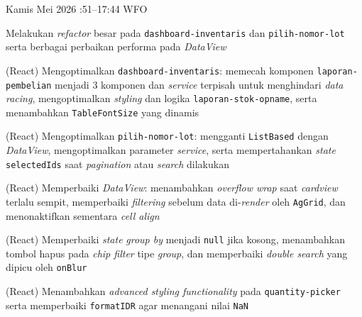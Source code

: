 \begin{logtable}
    {
        Kamis  Mei 2026 :51--17:44 \linebreak %
        WFO
    }{
        \begin{loglist}
            \item Melakukan \textit{refactor} besar pada \texttt{dashboard-inventaris} dan
            \texttt{pilih-nomor-lot} serta berbagai perbaikan performa pada
            \textit{DataView}
        \end{loglist}
    }{
        \begin{logwork}
            \item (React) Mengoptimalkan \texttt{dashboard-inventaris}: memecah komponen \texttt{laporan-pembelian} menjadi 3 komponen dan \textit{service} terpisah untuk menghindari \textit{data racing}, mengoptimalkan \textit{styling} dan logika \texttt{laporan-stok-opname}, serta menambahkan \texttt{TableFontSize} yang dinamis
            \item (React) Mengoptimalkan \texttt{pilih-nomor-lot}: mengganti \texttt{ListBased} dengan \textit{DataView}, mengoptimalkan parameter \textit{service}, serta mempertahankan \textit{state} \texttt{selectedIds} saat \textit{pagination} atau \textit{search} dilakukan
            \item (React) Memperbaiki \textit{DataView}: menambahkan \textit{overflow wrap} saat \textit{cardview} terlalu sempit, memperbaiki \textit{filtering} sebelum data di-\textit{render} oleh \texttt{AgGrid}, dan menonaktifkan sementara \textit{cell align}
            \item (React) Memperbaiki \textit{state} \textit{group by} menjadi \texttt{null} jika kosong, menambahkan tombol hapus pada \textit{chip filter} tipe \textit{group}, dan memperbaiki \textit{double search} yang dipicu oleh \texttt{onBlur}
            \item (React) Menambahkan \textit{advanced styling functionality} pada \texttt{quantity-picker} serta memperbaiki \texttt{formatIDR} agar menangani nilai \texttt{NaN}
        \end{logwork}
    }


\end{logtable}
